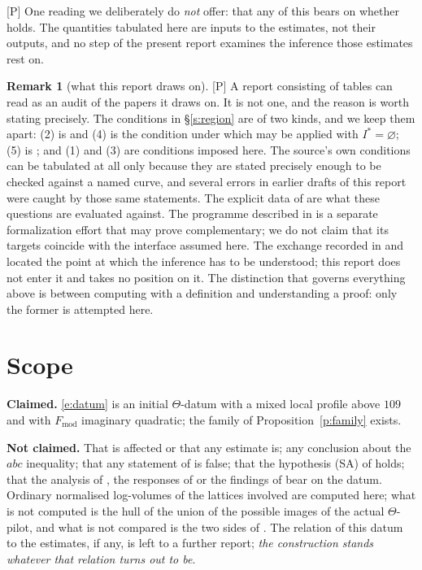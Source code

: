 \documentclass[11pt]{article}
\theoremstyle{plain}
\theoremstyle{definition}
\newtheorem{remark}{Remark}
\newcommand{\Fmod}{F_{\mathrm{mod}}}
\newcommand{\SA}{\textup{(SA)}}
\begin{document}
\textup{[P]} One reading we deliberately do \emph{not} offer: that any of this bears on
whether \cite[Cor.~3.12]{IUT3} holds.  The quantities tabulated here are inputs to the
estimates, not their outputs, and no step of the present report examines the inference
those estimates rest on.

\begin{remark}[what this report draws on]\label{r:respect}
\textup{[P]} A report consisting of tables can read as an audit of the papers it draws
on.  It is not one, and the reason is worth stating precisely.  The conditions
in \S\ref{s:region} are of two kinds, and we keep them apart: (2) is
\cite[Cor.~2.2(ii)]{IUT4} and (4) is the condition under which
\cite[Prop.~1.4(iii)]{IUT4} may be applied with $I^{*}=\varnothing$; (5) is
\cite[Def.~3.1(c)]{IUT1}; and (1) and (3) are conditions imposed here.  The source's own conditions can be tabulated at
all only because they are stated precisely enough to be checked against a named curve,
and several errors in earlier drafts of this report were caught by those same
statements.  The explicit data of \cite{DH25} are what these questions are evaluated
against.  The programme described in \cite{LANA} is a separate formalization effort
that may prove complementary; we do not claim that its targets coincide with the
interface assumed here.  The exchange recorded in \cite{SS} and
\cite{Rpt} located the point at which the inference has to be understood; this report
does not enter it and takes no position on it.  The distinction that governs everything
above is between computing with a definition and understanding a proof: only the former
is attempted here.
\end{remark}

\section{Scope}\label{s:scope}

\noindent\textbf{Claimed.}  \eqref{e:datum} is an initial $\Theta$-datum with a
mixed local profile above $109$ and with $\Fmod$ imaginary quadratic; the family of
Proposition~\ref{p:family} exists.

\smallskip\noindent\textbf{Not claimed.}  That \cite[Thm.~A]{MFHMP} is affected or
that any estimate is; any conclusion about the $abc$ inequality; that any statement of
\cite{IUT1,IUT2,IUT3,IUT4} is false; that the hypothesis \SA{} of \cite{First} holds;
that the analysis of \cite{SS}, the responses of \cite{Rpt} or the findings of
\cite{LANA} bear on the datum.  Ordinary normalised log-volumes of the lattices
involved are computed here; what is not computed is the hull of the union of the
possible images of the actual $\Theta$-pilot, and what is not compared is the two
sides of \cite[Cor.~3.12]{IUT3}.  The relation of this datum to the estimates, if any, is left to a further
report; \emph{the construction stands whatever that relation turns out to be}.
\end{document}
